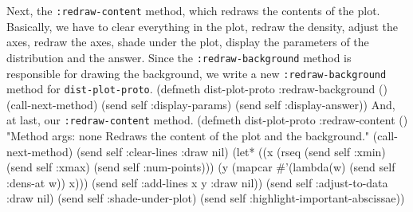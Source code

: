 Next, the {\tt{}:redraw-content} method, which redraws the contents of
the plot. Basically, we have to clear everything in the plot, redraw
the density, adjust the axes, redraw the axes, shade under the plot,
display the parameters of the distribution and the answer. Since the
{\tt{}:redraw-background} method is responsible for drawing the
background, we write a new {\tt{}:redraw-background} method for
{\tt{}dist-plot-proto}. 
\nwenddocs{}\endmoddef
(defmeth dist-plot-proto :redraw-background ()
  (call-next-method)
  (send self :display-params)
  (send self :display-answer))
\eatline
{}\nwendcode{}\nwdocspar
And, at last, our {\tt{}:redraw-content} method.
\nwenddocs{}\plusendmoddef
(defmeth dist-plot-proto :redraw-content ()
  "Method args: none
Redraws the content of the plot and the background."
  (call-next-method)
  (send self :clear-lines :draw nil)
  (let* ((x (rseq (send self :xmin) (send self :xmax)
                  (send self :num-points)))
         (y (mapcar #'(lambda(w) (send self :dens-at w)) x)))
    (send self :add-lines x y :draw nil))
  (send self :adjust-to-data :draw nil)
  (send self :shade-under-plot)
  (send self :highlight-important-abscissae))
